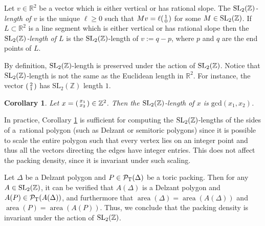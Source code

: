 \documentclass[10pt,a4paper]{amsart}
\numberwithin{equation}{section}
\newtheorem{Corollary}[Theorem]{Corollary}
\newenvironment{psmallmatrix}
 {\left(\begin{smallmatrix}}
 {\end{smallmatrix}\right)}
\def\R{{\mathbb R}}
\def\Z{{\mathbb Z}}
\newcommand{\De}{\Delta}
\newcommand{\area}{\operatorname{area}}
\newcommand{\PT}{\mathcal{P}_{\rm T}}
\newcommand{\SL}{{\rm SL}_2(\Z)}
\newcommand{\vect}[2]{\begin{psmallmatrix} #1 \\ #2 \end{psmallmatrix}}
\theoremstyle{definition}
\theoremstyle{plain}
\theoremstyle{plain}
\begin{document}
\begin{Definition}\label{def:sl2z-length} Let $v\in\R^2$ be a vector which is either vertical or has rational slope.
The \emph{$\SL$-length of $v$} is the unique $\ell\geq 0$
such that $Mv = \ell \vect{1}{0}$
for some $M\in\SL$.
If $L\subset \R^2$ is a line segment which is either vertical or has rational slope then the \emph{$\SL$-length of $L$} is the $\SL$-length of $v := q-p$, where $p$ and $q$ are the end points of $L$.
\end{Definition}

By definition, $\SL$-length is preserved under the action of $\SL$.
Notice that $\SL$-length is not the same as the Euclidean length in $\R^2$.
For instance, the vector $\begin{psmallmatrix} 2 \\ 1 \end{psmallmatrix}$ has $\mathrm{SL}_2(\mathbb{Z})$ length $1$.

\begin{Corollary} \label{cor:SL_gcd}
Let $ x = \vect{x_1}{x_2} \in \mathbb{Z}^2$. Then the $\SL$-length of $x$ is $\mathrm{gcd}(x_1, x_2)$.
\end{Corollary}



In practice, Corollary \ref{cor:SL_gcd} is sufficient for computing the $\SL$-lengths of the sides of a~rational polygon (such as Delzant or semitoric polygons) since it is possible to scale the entire polygon such that every vertex lies on an integer point and thus all the vectors directing the edges have integer entries. This does not affect the packing density, since it is invariant under such scaling.

\begin{Remark}
 Let $\De$ be a Delzant polygon and $P\in \PT(\De)$ be a toric packing.
 Then for any $A\in\SL$, it can be verified that $A(\De)$ is a Delzant polygon and $A(P)\in\PT(A(\De))$, and furthermore that $\area(\De) = \area(A(\De))$
 and $\area(P) = \area(A(P))$. Thus, we conclude that the packing density is invariant under the action of $\SL$.
\end{Remark}
\end{document}
